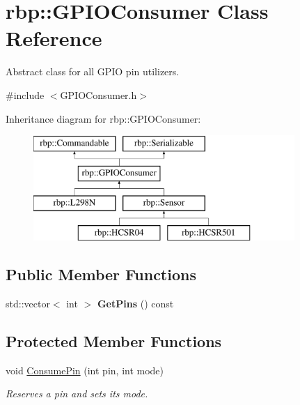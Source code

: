 \hypertarget{classrbp_1_1GPIOConsumer}{}\section{rbp\+:\+:G\+P\+I\+O\+Consumer Class Reference}
\label{classrbp_1_1GPIOConsumer}


Abstract class for all G\+P\+I\+O pin utilizers.  




{\ttfamily \#include $<$G\+P\+I\+O\+Consumer.\+h$>$}

Inheritance diagram for rbp\+:\+:G\+P\+I\+O\+Consumer\+:\begin{figure}[H]
\begin{center}
\leavevmode
\includegraphics[height=4.000000cm]{classrbp_1_1GPIOConsumer}
\end{center}
\end{figure}
\subsection*{Public Member Functions}
\begin{DoxyCompactItemize}
\item 
\hypertarget{classrbp_1_1GPIOConsumer_a7cfe130a22c2c65526ba5fc8ff067786}{}std\+::vector$<$ int $>$ {\bfseries Get\+Pins} () const \label{classrbp_1_1GPIOConsumer_a7cfe130a22c2c65526ba5fc8ff067786}

\end{DoxyCompactItemize}
\subsection*{Protected Member Functions}
\begin{DoxyCompactItemize}
\item 
void \hyperlink{classrbp_1_1GPIOConsumer_ad705c79a02dcee7b0719ea2981d85866}{Consume\+Pin} (int pin, int mode)
\begin{DoxyCompactList}\small\item\em Reserves a pin and sets its mode. \end{DoxyCompactList}\end{DoxyCompactItemize}


